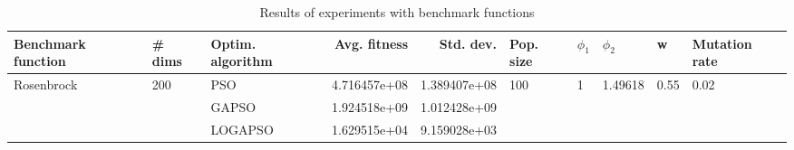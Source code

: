 \begin{table}
\centering
\caption{Results of experiments with benchmark functions}
\begin{tabular}{lllrrlllll}
\toprule
         Benchmark function &              \# dims & Optim. algorithm &  Avg. fitness &    Std. dev. &            Pop. size &         $\phi_{1}$ &               $\phi_{2}$ &                     w &         Mutation rate \\
\midrule
\multirow{3}{*}{Rosenbrock} & \multirow{3}{*}{200} &              PSO &  4.716457e+08 & 1.389407e+08 & \multirow{3}{*}{100} & \multirow{3}{*}{1} & \multirow{3}{*}{1.49618} & \multirow{3}{*}{0.55} & \multirow{3}{*}{0.02} \\
                            &                      &            GAPSO &  1.924518e+09 & 1.012428e+09 &                      &                    &                          &                       &                       \\
                            &                      &          LOGAPSO &  1.629515e+04 & 9.159028e+03 &                      &                    &                          &                       &                       \\
\bottomrule
\end{tabular}
\end{table}
